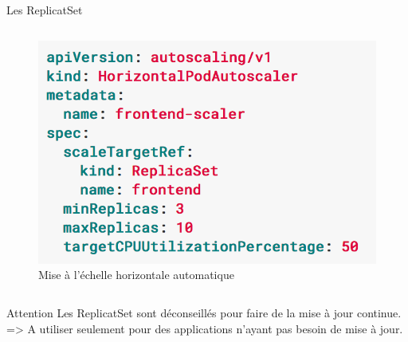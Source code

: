 \documentclass{bredelebeamer}
\begin{document}
\begin{frame}{Les ReplicatSet}
\begin{columns}
\begin{column}{0.5\textwidth}
\begin{figure}
\centering
\includegraphics[scale=0.4]{images/img17.png}
\caption{Mise à l'échelle horizontale automatique}
\end{figure}
\end{column}
\end{columns}

\begin{alertblock}{Attention}
Les ReplicatSet sont déconseillés pour faire de la mise à jour continue. \\
=> A utiliser seulement pour des applications n'ayant pas besoin de mise à jour.
\end{alertblock}
\end{frame}
\end{document}
